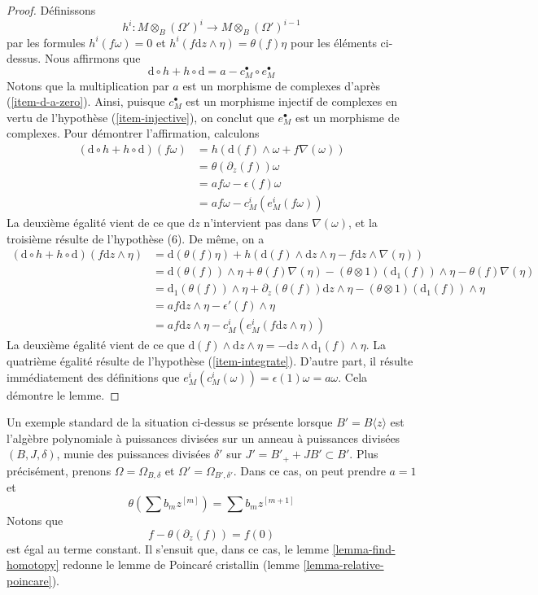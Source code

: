 \begin{proof}
\medskip\noindent
Définissons
$$
h^i : M \otimes_B (\Omega')^i \longrightarrow M \otimes_B (\Omega')^{i - 1}
$$
par les formules $h^i(f \omega) = 0$ et
$h^i(f \text{d}z \wedge \eta) = \theta(f) \eta$
pour les éléments ci-dessus. Nous affirmons que
$$
\text{d} \circ h + h \circ \text{d} = a - c_M^\bullet \circ e_M^\bullet
$$
Notons que la multiplication par $a$ est un morphisme de complexes
d'après (\ref{item-d-a-zero}). Ainsi, puisque $c_M^\bullet$ est un morphisme injectif
de complexes en vertu de l'hypothèse (\ref{item-injective}), on conclut que
$e_M^\bullet$ est un morphisme de complexes. Pour démontrer l'affirmation, calculons
\begin{align*}
(\text{d} \circ h + h \circ \text{d})(f \omega)
& =
h\left(\text{d}(f) \wedge \omega + f \nabla(\omega)\right)
\\
& =
\theta(\partial_z(f)) \omega
\\
& =
a f\omega - \epsilon(f)\omega 
\\
& =
a f \omega - c^i_M(e^i_M(f\omega))
\end{align*}
La deuxième égalité vient de ce que $\text{d}z$ n'intervient pas dans $\nabla(\omega)$,
et la troisième résulte de l'hypothèse (6). De même, on a
\begin{align*}
(\text{d} \circ h + h \circ \text{d})(f \text{d}z \wedge \eta)
& =
\text{d}(\theta(f) \eta) +
h\left(\text{d}(f) \wedge \text{d}z \wedge \eta -
f \text{d}z \wedge \nabla(\eta)\right)
\\
& =
\text{d}(\theta(f)) \wedge \eta + \theta(f) \nabla(\eta)
- (\theta \otimes 1)(\text{d}_1(f)) \wedge \eta
- \theta(f) \nabla(\eta)
\\
& =
\text{d}_1(\theta(f)) \wedge \eta +
\partial_z(\theta(f)) \text{d}z \wedge \eta -
(\theta \otimes 1)(\text{d}_1(f)) \wedge \eta
\\
& =
a f \text{d}z \wedge \eta - \epsilon'(f) \wedge \eta \\
& = a f \text{d}z \wedge \eta - c^i_M(e^i_M(f \text{d}z \wedge \eta))
\end{align*}
La deuxième égalité vient de ce que
$\text{d}(f) \wedge \text{d}z \wedge \eta =
- \text{d}z \wedge \text{d}_1(f) \wedge \eta$.
La quatrième égalité résulte de l'hypothèse (\ref{item-integrate}).
D'autre part, il résulte immédiatement des définitions
que $e^i_M(c^i_M(\omega)) = \epsilon(1) \omega = a \omega$.
Cela démontre le lemme.
\end{proof}

\begin{example}
\label{example-integrate}
Un exemple standard de la situation ci-dessus se présente lorsque
$B' = B\langle z \rangle$ est l'algèbre polynomiale à puissances divisées
sur un anneau à puissances divisées $(B, J, \delta)$, munie des puissances divisées
$\delta'$ sur $J' = B'_{+} + JB' \subset B'$. Plus précisément, prenons
$\Omega = \Omega_{B, \delta}$ et $\Omega' = \Omega_{B', \delta'}$.
Dans ce cas, on peut prendre $a = 1$ et
$$
\theta( \sum b_m z^{[m]} ) = \sum b_m z^{[m + 1]}
$$
Notons que
$$
f - \theta(\partial_z(f)) = f(0)
$$
est égal au terme constant. Il s'ensuit que, dans ce cas, le
lemme \ref{lemma-find-homotopy}
redonne le lemme de Poincar\'e cristallin
(lemme \ref{lemma-relative-poincare}).
\end{example}

